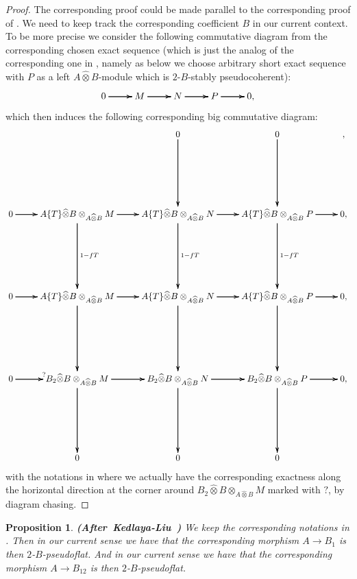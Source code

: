 \documentclass[12pt]{amsart}
\newtheorem{proposition}[theorem]{Proposition}
\theoremstyle{definition}
\numberwithin{equation}{section}
\begin{document}
\begin{proof}
The corresponding proof could be made parallel to the corresponding proof of \cite[Lemma 2.4.12]{KL2}. We need to keep track the corresponding coefficient $B$ in our current context. To be more precise we consider the following commutative diagram from the corresponding chosen exact sequence (which is just the analog of the corresponding one in \cite[Lemma 2.4.12]{KL2}, namely as below we choose arbitrary short exact sequence with $P$ as a left $A\widehat{\otimes}B$-module which is $2$-$B$-stably pseudocoherent):
\[
\xymatrix@C+0pc@R+0pc{
0   \ar[r]\ar[r]\ar[r] &M \ar[r]\ar[r]\ar[r] &N \ar[r]\ar[r]\ar[r] & P \ar[r]\ar[r]\ar[r] &0,
}
\]
which then induces the following corresponding big commutative diagram:
\[
\xymatrix@C+0pc@R+4pc{
& &0 \ar[d]\ar[d]\ar[d] &0 \ar[d]\ar[d]\ar[d] &,\\
0   \ar[r]\ar[r]\ar[r]  &{A\{T\}\widehat{\otimes}B}\otimes_{A\widehat{\otimes}B} M \ar[r]\ar[r]\ar[r] \ar[d]^{1-fT}\ar[d]\ar[d] &{A\{T\}\widehat{\otimes}B}\otimes_{A\widehat{\otimes}B} N \ar[r]\ar[r]\ar[r] \ar[d]^{1-fT}\ar[d]\ar[d] &{A\{T\}\widehat{\otimes}B} \otimes_{A\widehat{\otimes}B}P \ar[r]\ar[r]\ar[r] \ar[d]^{1-fT}\ar[d]\ar[d] &0,\\
0   \ar[r]\ar[r]\ar[r] &{A\{T\}\widehat{\otimes}B}\otimes_{A\widehat{\otimes}B}M  \ar[r]\ar[r]\ar[r] \ar[d]\ar[d]\ar[d] &{A\{T\}\widehat{\otimes}B} \otimes_{A\widehat{\otimes}B}N\ar[r]\ar[r]\ar[r] \ar[d]\ar[d]\ar[d] & {A\{T\}\widehat{\otimes}B}\otimes_{A\widehat{\otimes}B}P \ar[r]\ar[r]\ar[r] \ar[d]\ar[d]\ar[d] &0,\\
0  \ar[r]^?\ar[r]\ar[r] &{B_2\widehat{\otimes}B}\otimes_{A\widehat{\otimes}B} M \ar[r]\ar[r]\ar[r] \ar[d]\ar[d]\ar[d] &{B_2\widehat{\otimes}B}\otimes_{A\widehat{\otimes}B}N \ar[r]\ar[r]\ar[r] \ar[d]\ar[d]\ar[d] & {B_2\widehat{\otimes}B}\otimes_{A\widehat{\otimes}B} P \ar[r]\ar[r]\ar[r] \ar[d]\ar[d]\ar[d] &0,\\
&0&0&0
}
\]
with the notations in \cite[Lemma 2.4.10]{KL2} where we actually have the corresponding exactness along the horizontal direction at the corner around ${B_2\widehat{\otimes}B}\otimes_{A\widehat{\otimes}B} M $ marked with $?$, by diagram chasing.
\end{proof}


\begin{proposition} \mbox{\bf{(After Kedlaya-Liu \cite[Lemma 2.4.13]{KL2})}} \label{proposition2.9}
We keep the corresponding notations in \cite[Lemma 2.4.10]{KL2}. Then in our current sense we have that the corresponding morphism $A\rightarrow B_1$ is then $2$-$B$-pseudoflat. And in our current sense we have that the corresponding morphism $A\rightarrow B_{12}$ is then $2$-$B$-pseudoflat. 
\end{proposition}
\end{document}
